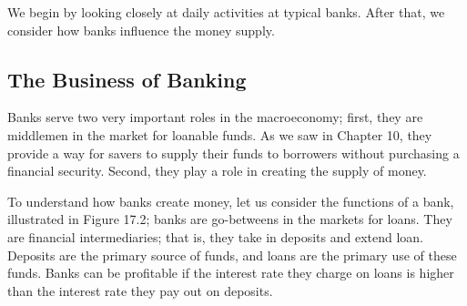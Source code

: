 \documentclass[11pt]{article} %
\begin{document}
We begin by looking closely at daily activities at typical banks. After that, we consider how banks influence the money supply.

\subsection*{The Business of Banking}
Banks serve two very important roles in the macroeconomy; first, they are middlemen in the market for loanable funds. As we saw in Chapter 10, they provide a way for savers to supply their funds to borrowers without purchasing a financial security. Second, they play a role in creating the supply of money.

To understand how banks create money, let us consider the functions of a bank, illustrated in Figure 17.2; banks are go-betweens in the markets for loans. They are financial intermediaries; that is, they take in deposits and extend loan. Deposits are the primary source of funds, and loans are the primary use of these funds. Banks can be profitable if the interest rate they charge on loans is higher than the interest rate they pay out on deposits.
\end{document}
